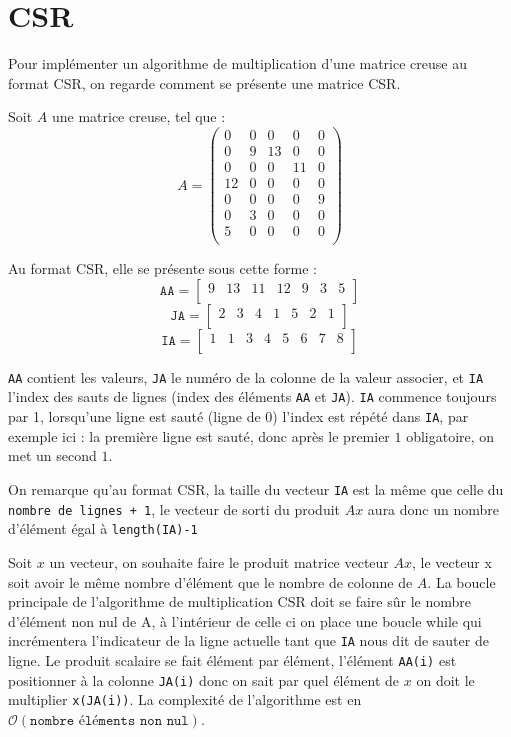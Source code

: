 \documentclass{article}
\begin{document}
\section{CSR}

Pour implémenter un algorithme de multiplication d'une matrice creuse au format CSR, on regarde comment se présente une matrice CSR.

Soit \(A\) une matrice creuse, tel que :
\[
A = 
\begin{pmatrix}
	0	&	0	&	0	&	0	& 0	\\
	0	&	9	&	13	&	0	& 0	\\
	0	&	0	&	0	&	11	& 0	\\
	12	&	0	&	0	&	0	& 0	\\
	0	&	0	&	0	&	0	& 9	\\
	0	&	3	&	0	&	0	& 0	\\
	5	&	0	&	0	&	0	& 0	\\
\end{pmatrix}
\]

Au format CSR, elle se présente sous cette forme :
\[
\texttt{AA}  = 
\begin{bmatrix}
9	&	13	&	11	&	12	&	9	&	3	&	5	\\
\end{bmatrix}
\]
\[
\texttt{JA}  = 
\begin{bmatrix}
2	&	3	&	4	&	1	&	5	&	2	&	1	\\
\end{bmatrix}
\]
\[
\texttt{IA}  = 
\begin{bmatrix}
1	&	1	&	3	&	4	&	5	&	6	&	7	&	8	\\
\end{bmatrix}
\]

\texttt{AA} contient les valeurs, \texttt{JA} le numéro de la colonne de la valeur associer, et \texttt{IA} l'index des sauts de lignes (index des éléments \texttt{AA} et \texttt{JA}). \texttt{IA} commence toujours par 1, lorsqu'une ligne est sauté (ligne de 0) l'index est répété dans \texttt{IA}, par exemple ici : la première ligne est sauté, donc après le premier \(1\) obligatoire, on met un second \(1\).

On remarque qu'au format CSR, la taille du vecteur \texttt{IA} est la même que celle du \texttt{nombre de lignes + 1}, le vecteur de sorti du produit \(Ax\) aura donc un nombre d'élément égal à \texttt{length(IA)-1}

Soit \(x\) un vecteur, on souhaite faire le produit matrice vecteur \(Ax\), le vecteur x soit avoir le même nombre d'élément que le nombre de colonne de \(A\).
La boucle principale de l'algorithme de multiplication CSR doit se faire sûr le nombre d'élément non nul de A, à l'intérieur de celle ci on place une boucle while qui incrémentera l'indicateur de la ligne actuelle tant que \texttt{IA} nous dit de sauter de ligne. Le produit scalaire se fait élément par élément, l'élément \texttt{AA(i)} est positionner à la colonne \texttt{JA(i)} donc on sait par quel élément de \(x\) on doit le multiplier \texttt{x(JA(i))}. La complexité de l'algorithme est en \(\mathcal{O}(\texttt{nombre\ éléments\ non\ nul})\).
\end{document}
